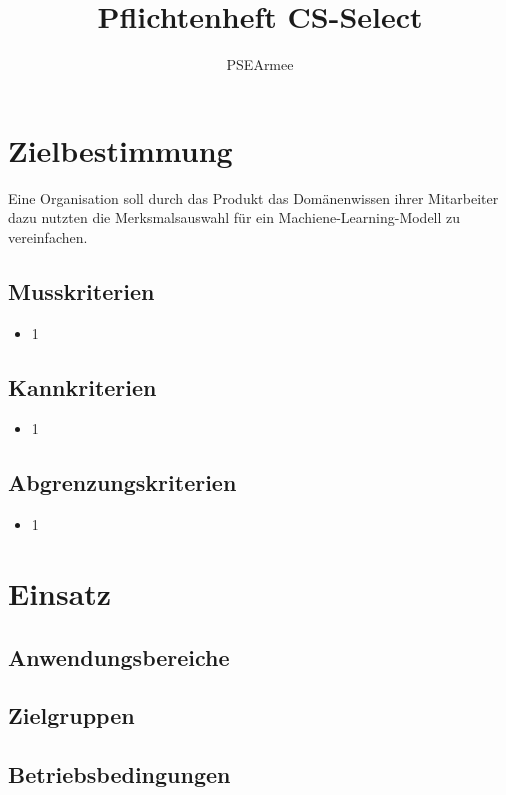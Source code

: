 \documentclass[a4paper]{scrreprt}
\begin{document}
 
\title{Pflichtenheft CS-Select}
\author{PSEArmee}
\maketitle
 
\tableofcontents
 
\chapter{Zielbestimmung}
Eine Organisation soll durch das Produkt das Domänenwissen ihrer Mitarbeiter dazu nutzten die Merksmalsauswahl für ein Machiene-Learning-Modell zu vereinfachen. 
\section{Musskriterien}
\begin{itemize}
\item 1
\end{itemize} 
\section{Kannkriterien}
\begin{itemize}
\item 1
\end{itemize} 
 
\section{Abgrenzungskriterien}
\begin{itemize} 
\item 1
\end{itemize} 
 
\chapter{Einsatz}
 
\section{Anwendungsbereiche}
 
\section{Zielgruppen}
 
\section{Betriebsbedingungen}
 
\end{document}
